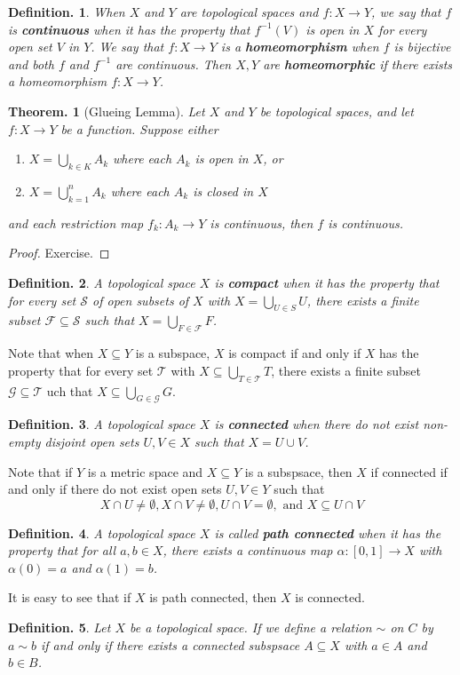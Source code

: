 \documentclass[11pt, a4paper]{memoir}
\theoremstyle{change}
\newtheorem{theorem}{Theorem.}[section]
\theoremstyle{plain}
\theoremstyle{nonumberplain}
\newtheorem{definition}{Definition.}
\newtheorem{proof}{Proof}
\numberwithin{equation}{section}
\begin{document}
\begin{definition}
    When $X$ and $Y$ are topological spaces and $f:X\to Y$, we say that $f$ is \textbf{continuous} when it has the property that $f^{-1}(V)$ is open in $X$ for every open set $V$ in $Y$.
    We say that $f:X\to Y$ is a \textbf{homeomorphism} when $f$ is bijective and both $f$ and $f^{-1}$ are continuous.
    Then $X,Y$ are \textbf{homeomorphic} if there exists a homeomorphism $f:X\to Y$.
\end{definition}
\begin{theorem}[Glueing Lemma]
    Let $X$ and $Y$ be topological spaces, and let $f:X\to Y$ be a function.
    Suppose either
    \begin{enumerate}[nl,r]
        \item $X=\bigcup_{k\in K}A_k$ where each $A_k$ is open in $X$, or
        \item $X=\bigcup_{k=1}^nA_k$ where each $A_k$ is closed in $X$
    \end{enumerate}
    and each restriction map $f_k:A_k\to Y$ is continuous, then $f$ is continuous.
\end{theorem}
\begin{proof}
    Exercise.
\end{proof}
\begin{definition}
    A topological space $X$ is \textbf{compact} when it has the property that for every set $\mathcal{S}$ of open subsets of $X$ with $X=\bigcup_{U\in S}U$, there exists a finite subset $\mathcal{F}\subseteq \mathcal{S}$ such that $X=\bigcup_{F\in\mathcal{F}}F$.
\end{definition}
Note that when $X\subseteq Y$ is a subspace, $X$ is compact if and only if $X$ has the property that for every set $\mathcal{T}$ with $X\subseteq\bigcup_{T\in\mathcal{T}}T$, there exists a finite subset $\mathcal{G}\subseteq\mathcal{T}$ uch that $X\subseteq\bigcup_{G\in\mathcal{G}}G$.
\begin{definition}
    A topological space $X$ is \textbf{connected} when there do not exist non-empty disjoint open sets $U,V\in X$ such that $X=U\cup V$.
\end{definition}
Note that if $Y$ is a metric space and $X\subseteq Y$ is a subspsace, then $X$ if connected if and only if there do not exist open sets $U,V\in Y$ such that
\begin{equation*}
    X\cap U\neq\emptyset, X\cap V\neq\emptyset, U\cap V=\emptyset,\text{ and }X\subseteq U\cap V
\end{equation*}
\begin{definition}
    A topological space $X$ is called \textbf{path connected} when it has the property that for all $a,b\in X$, there exists a continuous map $\alpha:[0,1]\to X$ with $\alpha(0)=a$ and $\alpha(1)=b$.
\end{definition}
It is easy to see that if $X$ is path connected, then $X$ is connected.
\begin{definition}
    Let $X$ be a topological space.
    If we define a relation $\sim$ on $C$ by $a\sim b$ if and only if there exists a connected subspsace $A\subseteq X$ with $a\in A$ and $b\in B$.
\end{definition}
\end{document}
